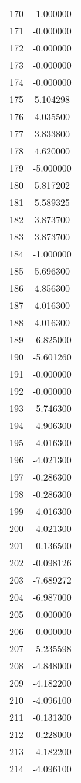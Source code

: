 \documentclass[12pt]{article}
\begin{document}
\begin{longtable}{@{}cc@{}}
170 & -1.000000 \\
171 & -0.000000 \\
172 & -0.000000 \\
173 & -0.000000 \\
174 & -0.000000 \\
175 & 5.104298 \\
176 & 4.035500 \\
177 & 3.833800 \\
178 & 4.620000 \\
179 & -5.000000 \\
180 & 5.817202 \\
181 & 5.589325 \\
182 & 3.873700 \\
183 & 3.873700 \\
184 & -1.000000 \\
185 & 5.696300 \\
186 & 4.856300 \\
187 & 4.016300 \\
188 & 4.016300 \\
189 & -6.825000 \\
190 & -5.601260 \\
191 & -0.000000 \\
192 & -0.000000 \\
193 & -5.746300 \\
194 & -4.906300 \\
195 & -4.016300 \\
196 & -4.021300 \\
197 & -0.286300 \\
198 & -0.286300 \\
199 & -4.016300 \\
200 & -4.021300 \\
201 & -0.136500 \\
202 & -0.098126 \\
203 & -7.689272 \\
204 & -6.987000 \\
205 & -0.000000 \\
206 & -0.000000 \\
207 & -5.235598 \\
208 & -4.848000 \\
209 & -4.182200 \\
210 & -4.096100 \\
211 & -0.131300 \\
212 & -0.228000 \\
213 & -4.182200 \\
214 & -4.096100 \\

\end{longtable}
\end{document}
